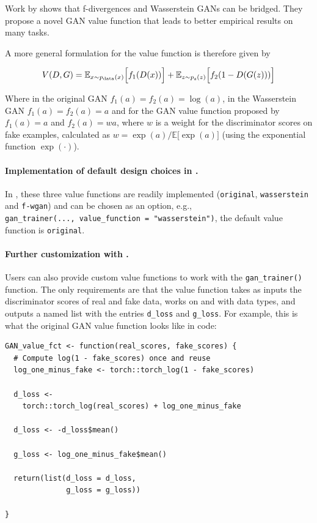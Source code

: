 Work by \citet{song2020bridging} shows that f-divergences and Wasserstein GANs can be bridged. They propose a novel GAN value function that leads to better empirical results on many tasks.

A more general formulation for the value function is therefore given by

\begin{equation}\label{eq:general}
V(D,G) = \mathbb{E}_{x \sim p_{\rm data}(x)}\Big[f_1( D(x))\Big] + \mathbb{E}_{z \sim p_{\rm z}(z)}\Big[f_2(1-D(G(z)))\Big]
\end{equation}

Where in the original GAN \(f_1(a) = f_2(a) = \log(a)\), in the
Wasserstein GAN \(f_1(a) = f_2(a) = a\) and for the GAN value function
proposed by \citet{song2020bridging} \(f_1(a) = a\) and \(f_2(a) = wa\), where \(w\)
is a weight for the discriminator scores on fake examples, calculated as
\(w = \exp(a)/\mathbb{E}\Big[\exp(a)\Big]\) (using the exponential function \(\exp(\cdot)\)).

\paragraph{\texorpdfstring{Implementation of default design choices in .}{Implementation of default design choices in .}}\label{implementation-of-default-design-choices-in-.}

In , these three value functions are readily implemented (\texttt{original}, \texttt{wasserstein} and \texttt{f-wgan}) and can be chosen as an option, e.g., \texttt{gan\_trainer(...,\ value\_function\ =\ "wasserstein")}, the default value function is \texttt{original}.

\paragraph{\texorpdfstring{Further customization with .}{Further customization with .}}\label{further-customization-with-.}

Users can also provide custom value functions to work with the  \texttt{gan\_trainer()} function. The only requirements are that the value function takes as inputs the discriminator scores of real and fake data, works on and with  data types, and outputs a named list with the entries \texttt{d\_loss} and \texttt{g\_loss}. For example, this is
what the original GAN value function looks like in code:

\begin{verbatim}
GAN_value_fct <- function(real_scores, fake_scores) {
  # Compute log(1 - fake_scores) once and reuse
  log_one_minus_fake <- torch::torch_log(1 - fake_scores)

  d_loss <-
    torch::torch_log(real_scores) + log_one_minus_fake

  d_loss <- -d_loss$mean()

  g_loss <- log_one_minus_fake$mean()

  return(list(d_loss = d_loss,
              g_loss = g_loss))

}
\end{verbatim}

